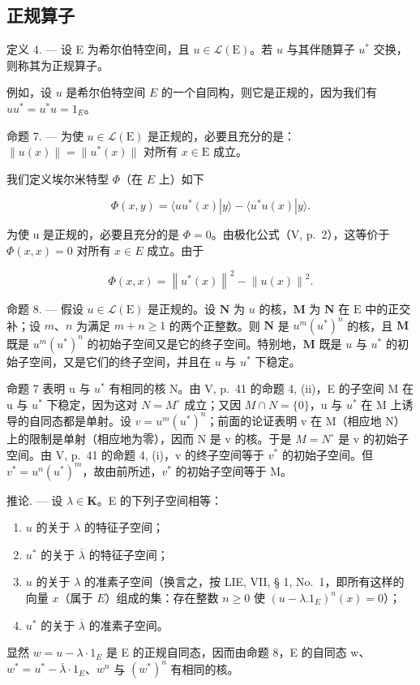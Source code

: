 \subsection{正规算子}

定义 4. --- 设 E 为希尔伯特空间，且 \(u \in \mathcal{L}(\mathrm{E})\)。若 \(u\) 与其伴随算子 \(u^{*}\) 交换，则称其为正规算子。

例如，设 \(u\) 是希尔伯特空间 \(E\) 的一个自同构，则它是正规的，因为我们有 \(uu^{*} = u^{*}u = 1_{E}\)。

命题 7. --- 为使 \(u \in \mathcal{L}(\mathrm{E})\) 是正规的，必要且充分的是：\(\| u(x) \| = \| u^{*}(x) \|\) 对所有 \(x \in \mathrm{E}\) 成立。

我们定义埃尔米特型 \(\Phi\)（在 \(E\) 上）如下

\[
\Phi (x, y) = \langle u u ^ {*} (x) | y \rangle - \langle u ^ {*} u (x) | y \rangle .
\]

为使 u 是正规的，必要且充分的是 \(\Phi = 0\)。由极化公式（V, p.~2），这等价于 \(\Phi(x, x) = 0\) 对所有 \(x \in E\) 成立。由于

\[
\Phi (x, x) = \left\| u ^ {*} (x) \right\| ^ {2} - \left\| u (x) \right\| ^ {2}.
\]

命题 8. --- 假设 \(u \in \mathcal{L}(\mathrm{E})\) 是正规的。设 \(\mathbf{N}\) 为 \(u\) 的核，\(\mathbf{M}\) 为 \(\mathbf{N}\) 在 \(\mathrm{E}\) 中的正交补；设 \(m\)、\(n\) 为满足 \(m + n \geqslant 1\) 的两个正整数。则 \(\mathbf{N}\) 是 \(u^{m}(u^{*})^{n}\) 的核，且 \(\mathbf{M}\) 既是 \(u^{m}(u^{*})^{n}\) 的初始子空间又是它的终子空间。特别地，\(\mathbf{M}\) 既是 \(u\) 与 \(u^{*}\) 的初始子空间，又是它们的终子空间，并且在 \(u\) 与 \(u^{*}\) 下稳定。

命题 7 表明 u 与 \(u^{*}\) 有相同的核 N。由 V, p.~41 的命题 4, (ii)，E 的子空间 M 在 u 与 \(u^{*}\) 下稳定，因为这对 \(N = M^{\circ}\) 成立；又因 \(M \cap N = \{0\}\)，u 与 \(u^{*}\) 在 M 上诱导的自同态都是单射。设 \(v = u^{m}(u^{*})^{n}\)；前面的论证表明 v 在 M（相应地 N）上的限制是单射（相应地为零），因而 N 是 v 的核。于是 \(M = N^{\circ}\) 是 v 的初始子空间。由 V, p.~41 的命题 4, (i)，v 的终子空间等于 \(v^{*}\) 的初始子空间。但 \(v^{*} = u^{n}(u^{*})^{m}\)，故由前所述，\(v^{*}\) 的初始子空间等于 M。

推论. --- 设 \(\lambda \in \mathbf{K}\)。E 的下列子空间相等：

\begin{enumerate}
\def\labelenumi{\alph{enumi})}
\item
  \(u\) 的关于 \(\lambda\) 的特征子空间；
\item
  \(u^{*}\) 的关于 \(\overline{\lambda}\) 的特征子空间；
\item
  \(u\) 的关于 \(\lambda\) 的准素子空间（换言之，按 LIE, VII, § 1, No.~1，即所有这样的向量 \(x\)（属于 \(E\)）组成的集：存在整数 \(n \geqslant 0\) 使 \((u - \lambda .1_{E})^{n}(x) = 0\)）；
\item
  \(u^{*}\) 的关于 \(\overline{\lambda}\) 的准素子空间。
\end{enumerate}

显然 \(w = u - \lambda \cdot 1_{E}\) 是 E 的正规自同态，因而由命题 8，E 的自同态 w、\(w^{*} = u^{*} - \overline{\lambda} \cdot 1_{E}\)、\(w^{n}\) 与 \((w^{*})^{n}\) 有相同的核。

